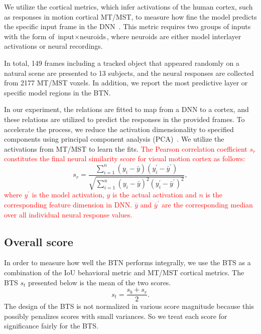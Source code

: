 \documentclass[final,3p,times,twocolumn]{elsarticle}
\begin{document}
We utilize the cortical metrics, which infer activations of the human cortex, such as responses in motion cortical MT/MST, to measure how fine the model predicts the specific input frame in the DNN~\cite{yamins2014performance}. 
This metric requires two groups of inputs with the form of $\text{input} \times \text{neuroids}$, where neuroids are either model interlayer activations or neural recordings. 

In total, 149 frames including a tracked object that appeared randomly on a natural scene are presented to 13 subjects,
and the neural responses are collected from 2177 MT/MST voxels. 
In addition, we report the most predictive layer or specific model regions in the BTN. 

In our experiment, the relations are fitted to map from a DNN to a cortex, and these relations are utilized to predict the responses in the provided frames. 
To accelerate the process, we reduce the activation dimensionality to specified components using principal component analysis (PCA)~\cite{2002Principal}. 
We utilize the activations from MT/MST to learn the fits. 
\textcolor{red}{
The Pearson correlation coefficient $s_r$ constitutes the final neural similarity score for visual motion cortex as follows:
}
\begin{equation}
s_r=\frac{\sum_{i=1}^{n} (y_i-\bar{y}) (y_i^\prime - \bar{y}^\prime) }{\sqrt{\sum_{i=1}^{n} (y_i - \bar{y})^2 (y_i^\prime - \bar{y}^\prime)^2 }},
\end{equation}
\textcolor{red}{
where $y^\prime$ is the model activation, $y$ is the actual activation and $n$ is the corresponding feature dimension in DNN. $\bar{y}$ and $\bar{y}^\prime$ are the corresponding median over all individual neural response values.
}


\subsection{Overall score}
In order to measure how well the BTN performs integrally, we use the BTS as a combination of the IoU behavioral metric and MT/MST cortical metrics.
The BTS $s_{t}$ presented below is the mean of the two scores. 
\begin{equation} \label{equ:score_btn}
s_{t} = \frac{s_b + s_r}{2}.
\end{equation}
The design of the BTS is not normalized in various score magnitude because this possibly penalizes scores with small variances.
So we treat each score for significance fairly for the BTS. 
\end{document}
